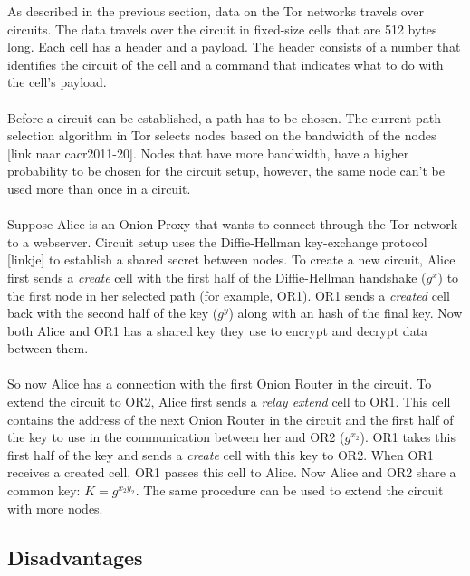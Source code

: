 \documentclass[journal]{IEEEtran}
\begin{document}
As described in the previous section, data on the Tor networks travels over circuits. The data travels over the circuit in fixed-size cells that are 512 bytes long. Each cell has a header and a payload. The header consists of a number that identifies the circuit of the cell and a command that indicates what to do with the cell’s payload.\\\\
Before a circuit can be established, a path has to be chosen. The current path selection algorithm in Tor selects nodes based on the bandwidth of the nodes [link naar cacr2011-20]. Nodes that have more bandwidth, have a higher probability to be chosen for the circuit setup, however, the same node can't be used more than once in a circuit.\\\\
Suppose Alice is an Onion Proxy that wants to connect through the Tor network to a webserver. Circuit setup uses the Diffie-Hellman key-exchange protocol [linkje] to establish a shared secret between nodes. To create a new circuit, Alice first sends a \emph{create} cell with the first half of the Diffie-Hellman handshake ($ g^x $) to the first node in her selected path (for example, OR1). OR1 sends a \emph{created} cell back with the second half of the key ($ g^y $) along with an hash of the final key. Now both Alice and OR1 has a shared key they use to encrypt and decrypt data between them.\\\\
So now Alice has a connection with the first Onion Router in the circuit. To extend the circuit to OR2, Alice first sends a \emph{relay extend} cell to OR1. This cell contains the address of the next Onion Router in the circuit and the first half of the key to use in the communication between her and OR2 ($ g^{x_2} $). OR1 takes this first half of the key and sends a \emph{create} cell with this key to OR2. When OR1 receives a created cell, OR1 passes this cell to Alice. Now Alice and OR2 share a common key: $ K = g^{x_2y_2} $. The same procedure can be used to extend the circuit with more nodes.

		\subsection{Disadvantages}
		
\end{document}
